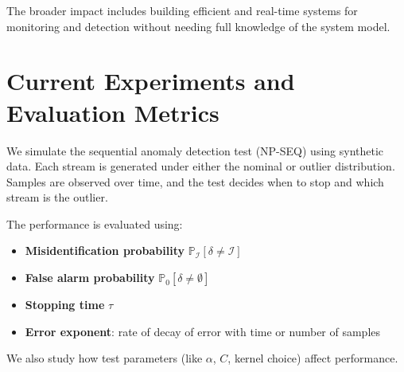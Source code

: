The broader impact includes building efficient and real-time systems for monitoring and detection without needing full knowledge of the system model.

\section{Current Experiments and Evaluation Metrics}

We simulate the sequential anomaly detection test (NP-SEQ) using synthetic data. Each stream is generated under either the nominal or outlier distribution. Samples are observed over time, and the test decides when to stop and which stream is the outlier.

The performance is evaluated using:
\begin{itemize}
    \item \textbf{Misidentification probability} $\mathbb{P}_\mathcal{I}[\delta \neq \mathcal{I}]$
    \item \textbf{False alarm probability} $\mathbb{P}_0[\delta \neq \emptyset]$
    \item \textbf{Stopping time} $\tau$
    \item \textbf{Error exponent}: rate of decay of error with time or number of samples
\end{itemize}

We also study how test parameters (like $\alpha$, $C$, kernel choice) affect performance.



